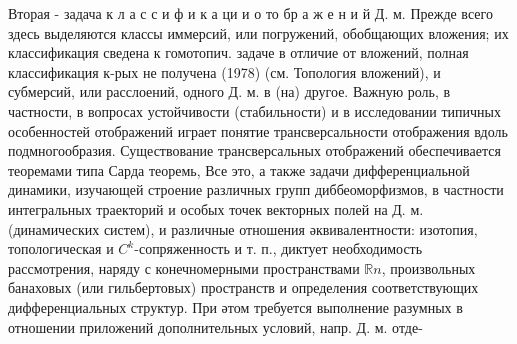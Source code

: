 \documentclass[10pt]{article}
\begin{document}
Вторая - задача к л а с с и ф и к а ци и о то бр а ж е н и й Д. м. Прежде всего здесь выделяются классы иммерсий, или погружений, обобщающих вложения; их классификация сведена к гомотопич. задаче в отличие от вложений, полная классификация к-рых не получена (1978) (см. Топология вложений), и субмерсий, или расслоений, одного Д. м. в (на) другое. Важную роль, в частности, в вопросах устойчивости (стабильности) и в исследовании типичных особенностей отображений играет понятие трансверсальности отображения вдоль подмногообразия. Существование трансверсальных отображений обеспечивается теоремами типа Сарда теоремь, Все это, а также задачи дифференциальной динамики, изучающей строение различных групп диббеоморфизмов, в частности интегральных траекторий и особых точек векторных полей на Д. м. (динамических систем), и различные отношения әквивалентности: изотопия, топологическая и $C^{k}$-сопряженность и т. п., диктует необходимость рассмотрения, наряду с конечномерными пространствами $\mathbb{R} n$, произвольных банаховых (или гильбертовых) пространств и определения соответствующих дифференциальных структур. При әтом требуется выполнение разумных в отношении приложений дополнительных условий, напр. Д. м. отде-
\end{document}
